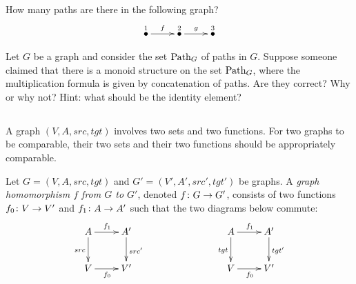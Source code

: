 \documentclass[CT4S-EN-RU]{subfiles}
\begin{document}
\begin{exerciseENG}
How many paths are there in the following graph? 
$$\xymatrix{\LMO{1}\ar[r]^{f}&\LMO{2}\ar[r]^{g}&\LMO{3}}$$
\end{exerciseENG}

\begin{exerciseRUS}
\end{exerciseRUS}

\begin{exerciseENG}
Let $G$ be a graph and consider the set $\textnormal{Path}_G$ of paths in $G$. Suppose someone claimed that there is a monoid structure on the set $\textnormal{Path}_G$, where the multiplication formula is given by concatenation of paths. Are they correct? Why or why not? Hint: what should be the identity element?
\end{exerciseENG}

\begin{exerciseRUS}
\end{exerciseRUS}


\subsection{}

\begin{blockENG}
A graph $(V,A,src,tgt)$ involves two sets and two functions. For two graphs to be comparable, their two sets and their two functions should be appropriately comparable.
\end{blockENG}

\begin{blockRUS}
\end{blockRUS}

\begin{definitionENG}\label{def:graph homomorphism}
Let $G=(V,A,src,tgt)$ and $G'=(V',A',src',tgt')$ be graphs. A {\em graph homomorphism $f$ from $G$ to $G'$}, denoted $f\colon G\rightarrow G'$, consists of two functions $f_0\colon V\rightarrow V'$ and $f_1\colon A\rightarrow A'$ such that the two diagrams below commute:
\begin{align}\label{dia:graph hom}
\xymatrix{A\ar[r]^{f_1}\ar[d]_{src}&A'\ar[d]^{src'}\\V\ar[r]_{f_0}&V'
}\hspace{1in}
\xymatrix{A\ar[r]^{f_1}\ar[d]_{tgt}&A'\ar[d]^{tgt'}\\V\ar[r]_{f_0}&V'
}
\end{align}
\end{definitionENG}
\end{document}
